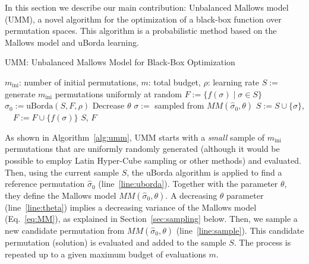 \documentclass[runningheads]{llncs}
\newcommand{\assign}{\ensuremath{:=}}
\newcommand{\minit}{\ensuremath{m_\text{ini}}\xspace}
\newcommand{\FEmax}{\ensuremath{m}}
\begin{document}
In this section we describe our main contribution: Unbalanced Mallows model
(UMM), a novel algorithm for the optimization of a black-box function over
permutation spaces. This algorithm is a probabilistic method based on the
Mallows model and uBorda learning.


\begin{algorithm}[t]
 \caption{UMM: Unbalanced Mallows Model for Black-Box Optimization}
 \label{alg:umm}
  \begin{algorithmic}[1]
    \Require $\minit$: number of initial permutations, $\FEmax$: total budget, $\rho$: learning rate
    \State $S \assign $ generate $\minit$ permutations uniformly at random
    \State $F \assign \{ f(\sigma) \mid \sigma \in S\}$ 
    \For{$i \assign \minit$ \textbf{to} $\FEmax$ \text{evaluations}}
    \State $\hat\sigma_0 \assign \text{uBorda}(S, F,\rho)$\label{line:uborda}
    \State Decrease  $\theta$\label{line:theta}
    \State $\sigma \assign$ sampled from  $MM(\hat\sigma_0, \theta)$\label{line:sample}
    \State $S \assign S \cup \{\sigma\}$, $\quad F \assign F \cup \{f(\sigma)\}$
    \EndFor 
    \State \Return $S$, $F$
 \end{algorithmic}
\end{algorithm}


As shown in Algorithm~\ref{alg:umm}, UMM  starts with a \emph{small} sample of $\minit$ permutations that are uniformly randomly generated (although it would be possible to employ Latin Hyper-Cube sampling or other methods) and evaluated. Then, using the current sample $S$, the uBorda algorithm is applied to find a reference permutation $\hat{\sigma}_0$ (line~\ref{line:uborda}). Together with the parameter $\theta$, they define the Mallows model $MM(\hat\sigma_0, \theta)$. A decreasing $\theta$ parameter (line~\ref{line:theta}) implies a decreasing variance of the Mallows model (Eq.~\ref{eq:MM}), as explained in  Section~\ref{sec:sampling} below. Then, we sample a new candidate permutation from  $MM(\hat\sigma_0, \theta)$ (line~\ref{line:sample}). This candidate permutation (solution) is evaluated and added to the sample $S$. The process is repeated up to a given maximum budget of evaluations $\FEmax$.
\end{document}
